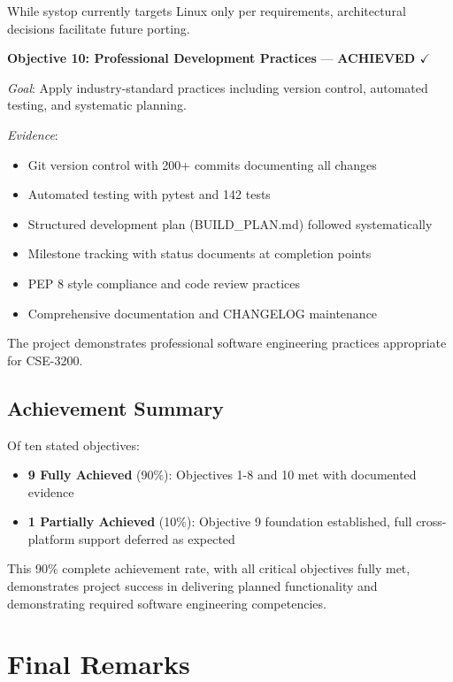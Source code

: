 \documentclass[12pt,a4paper,oneside]{report}
\begin{document}
While systop currently targets Linux only per requirements, architectural decisions facilitate future porting.

\textbf{Objective 10: Professional Development Practices} --- \textbf{ACHIEVED $\checkmark$}

\textit{Goal}: Apply industry-standard practices including version control, automated testing, and systematic planning.

\textit{Evidence}:
\begin{itemize}
    \item Git version control with 200+ commits documenting all changes
    \item Automated testing with pytest and 142 tests
    \item Structured development plan (BUILD\_PLAN.md) followed systematically
    \item Milestone tracking with status documents at completion points
    \item PEP 8 style compliance and code review practices
    \item Comprehensive documentation and CHANGELOG maintenance
\end{itemize}

The project demonstrates professional software engineering practices appropriate for CSE-3200.

\subsection{Achievement Summary}

Of ten stated objectives:
\begin{itemize}
    \item \textbf{9 Fully Achieved} (90\%): Objectives 1-8 and 10 met with documented evidence
    \item \textbf{1 Partially Achieved} (10\%): Objective 9 foundation established, full cross-platform support deferred as expected
\end{itemize}

This 90\% complete achievement rate, with all critical objectives fully met, demonstrates project success in delivering planned functionality and demonstrating required software engineering competencies.

\section{Final Remarks}
\label{sec:final-remarks}
\end{document}
